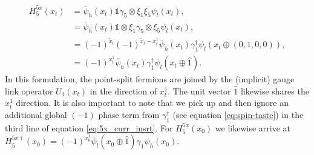 \begin{equation}\label{eq:5x_curr_insrt}
\begin{split}
    H^{5x}_{5}(x_t) &= \overline{\psi}_h(x_t) \mathds{1}\gamma_5\otimes \xi_1\xi_5 \psi_l(x_t),\\
    &= \overline{\psi}_h(x_t) \mathds{1}\otimes\xi_1\gamma_5\otimes\xi_5 \psi_l(x_t),\\
    &= (-1)^{\tilde{x}_t}(-1)^{\tilde{x}_t - x^1_t}\overline{\psi}_h(x_t)\gamma_1^\dagger\psi_l(x_t \oplus (0,1,0,0)),\\
    &=(-1)^{x^1_t}\overline{\psi}_h(x_t)\gamma_1^\dagger\psi_l(x_t \oplus \hat1).
\end{split}
\end{equation}
In this formulation, the point-split fermions are joined by the (implicit) gauge link operator $U_1(x_t)$ in the direction of $x^1_t$.  The unit vector $\hat1$ likewise shares the $x^1_t$ direction.  It is also important to note that we pick up and then ignore an additional global $(-1)$ phase term from $\gamma_1^\dagger$ (see equation \ref{eq:spin-taste}) in the third line of equation \ref{eq:5x_curr_insrt}. For $H^{5x}_{5}(x_0)$ we likewise arrive at $H^{5x\dagger}_{5}(x_0) = (-1)^{x^1_0}\overline{\psi}_l(x_0\oplus \hat1)\gamma_1\psi_h(x_0)$. 


